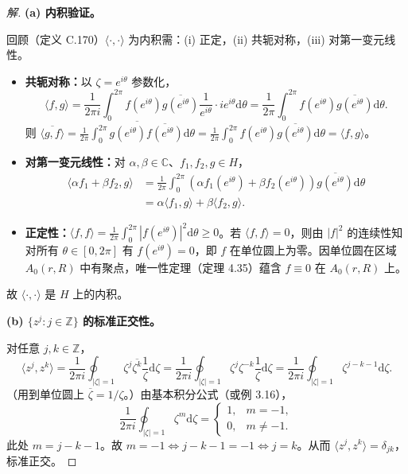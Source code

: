 \documentclass[11pt,a4paper]{article}
\newcommand{\C}{\mathbb{C}}
\newcommand{\Z}{\mathbb{Z}}
\newcommand{\dd}{\mathrm{d}}
\theoremstyle{definition}
\newenvironment{solution}{\begin{proof}[解]}{\end{proof}}
\begin{document}
\begin{solution}
  \textbf{(a) 内积验证。}

  回顾（定义 C.170）$\langle\cdot,\cdot\rangle$ 为内积需：(i) 正定，(ii) 共轭对称，(iii) 对第一变元线性。

  \begin{itemize}
    \item \textbf{共轭对称：}以 $\zeta = e^{i\theta}$ 参数化，
    \[
      \langle f, g \rangle = \frac{1}{2\pi i} \int_0^{2\pi}
      f(e^{i\theta}) \overline{g(e^{i\theta})} \frac{1}{e^{i\theta}}
      \cdot ie^{i\theta} \dd\theta
      = \frac{1}{2\pi} \int_0^{2\pi}
      f(e^{i\theta}) \overline{g(e^{i\theta})} \dd\theta.
    \]
    则 $\overline{\langle g, f \rangle} = \overline{\frac{1}{2\pi}\int_0^{2\pi} g(e^{i\theta}) \overline{f(e^{i\theta})} \dd\theta} = \frac{1}{2\pi} \int_0^{2\pi} f(e^{i\theta}) \overline{g(e^{i\theta})} \dd\theta = \langle f, g \rangle$。

    \item \textbf{对第一变元线性：}对 $\alpha, \beta \in \C$、$f_1, f_2, g \in H$，
    \begin{align*}
      \langle \alpha f_1 + \beta f_2, g \rangle
      &= \frac{1}{2\pi} \int_0^{2\pi}
      (\alpha f_1(e^{i\theta}) + \beta f_2(e^{i\theta}))
      \overline{g(e^{i\theta})} \dd\theta\\
      &= \alpha \langle f_1, g \rangle + \beta \langle f_2, g \rangle.
    \end{align*}

    \item \textbf{正定性：}$\langle f, f \rangle = \frac{1}{2\pi} \int_0^{2\pi} |f(e^{i\theta})|^2 \dd\theta \ge 0$。若 $\langle f, f \rangle = 0$，则由 $|f|^2$ 的连续性知对所有 $\theta \in [0, 2\pi]$ 有 $f(e^{i\theta}) = 0$，即 $f$ 在单位圆上为零。因单位圆在区域 $A_0(r, R)$ 中有聚点，唯一性定理（定理 4.35）蕴含 $f \equiv 0$ 在 $A_0(r, R)$ 上。
  \end{itemize}
  故 $\langle\cdot,\cdot\rangle$ 是 $H$ 上的内积。

  \medskip
  \textbf{(b) $\{z^j : j \in \Z\}$ 的标准正交性。}

  对任意 $j, k \in \Z$，
  \[
    \langle z^j, z^k \rangle
    = \frac{1}{2\pi i} \oint_{|\zeta|=1} \zeta^j \overline{\zeta^k}
    \frac{1}{\zeta} \dd\zeta
    = \frac{1}{2\pi i} \oint_{|\zeta|=1} \zeta^j \zeta^{-k}
    \frac{1}{\zeta} \dd\zeta
    = \frac{1}{2\pi i} \oint_{|\zeta|=1} \zeta^{j-k-1} \dd\zeta.
  \]
  （用到单位圆上 $\overline{\zeta} = 1/\zeta$。）由基本积分公式（或例 3.16），
  \[
    \frac{1}{2\pi i} \oint_{|\zeta|=1} \zeta^{m} \dd\zeta
    = \begin{cases}
      1, & m = -1,\\
      0, & m \ne -1.
    \end{cases}
  \]
  此处 $m = j-k-1$。故 $m = -1 \iff j-k-1 = -1 \iff j = k$。从而 $\langle z^j, z^k \rangle = \delta_{jk}$，标准正交。


\end{solution}
\end{document}
